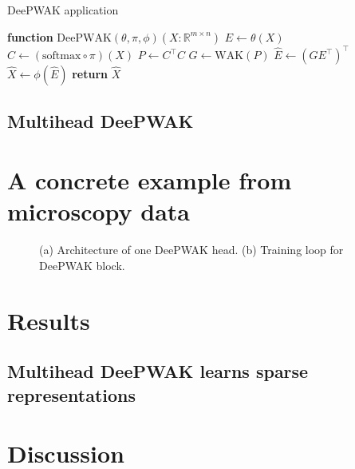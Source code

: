 \documentclass{article}
\begin{document}
\begin{algorithm}
  \caption{DeePWAK application}\label{alg:cap}
  \begin{algorithmic}[1]
    \State \textbf{function} $\mathrm{DeePWAK}(\theta, \pi, \phi)(X : \mathbb{R}^{m \times n})${
    \State $E \gets \theta(X)$
    \State $C \gets (\mathrm{softmax} \circ \pi)(X)$
    \State $P \gets C^\top C$
    \State $G \gets \mathrm{WAK}(P)$
    \State $\hat{E} \gets (GE^\top)^\top$
    \State $\hat{X} \gets \phi(\hat{E})$
    \State \textbf{return} $\hat{X}$
    }
  \end{algorithmic}
\end{algorithm}

\subsection{Multihead DeePWAK}

\section{A concrete example from microscopy data}

\begin{figure}
     \begin{subfigure}[b]{0.45\textwidth}
        
         \caption{}
         \label{fig:}
     \end{subfigure}

     \hfill
     \begin{subfigure}[b]{0.45\textwidth}
        
         \caption{}
         \label{fig:}
     \end{subfigure}
     

     
     \caption{(a) Architecture of one DeePWAK head. (b) Training loop for DeePWAK block.}
     \label{fig:}
\end{figure}


\section{Results}

\subsection{Multihead DeePWAK learns sparse representations}

\section{Discussion}

\printbibliography
\end{document}
